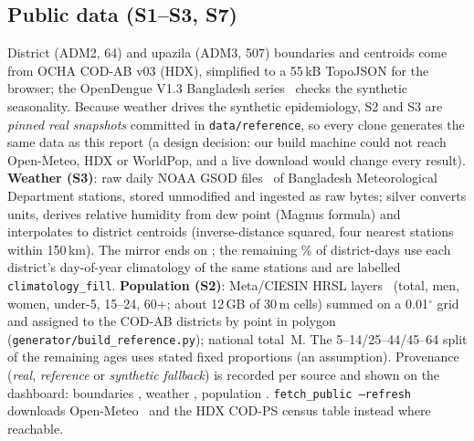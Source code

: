 \documentclass[conference]{IEEEtran}
\begin{document}
\subsection{Public data (S1--S3, S7)}
District (ADM2, 64) and upazila (ADM3, 507) boundaries and centroids come from OCHA COD-AB v03 (HDX),
simplified to a 55\,kB TopoJSON for the browser; the OpenDengue V1.3 Bangladesh series~\cite{opendengue} checks
the synthetic seasonality. Because weather drives the synthetic epidemiology, S2 and S3 are \emph{pinned real
snapshots} committed in \texttt{data/reference}, so every clone generates the same data as this report (a
design decision: our build machine could not reach Open-Meteo, HDX or WorldPop, and a live download would
change every result). \textbf{Weather (S3)}: raw daily NOAA GSOD files~\cite{gsod} of \WxStations{} Bangladesh
Meteorological Department stations, stored unmodified and ingested as raw bytes; silver converts units, derives
relative humidity from dew point (Magnus formula) and interpolates to district centroids (inverse-distance
squared, four nearest stations within 150\,km). The mirror ends on \WxObservedUntil{}; the remaining
\WxFillPct{}\% of district-days use each district's day-of-year climatology of the same stations and are labelled
\texttt{climatology\_fill}. \textbf{Population (S2)}: Meta/CIESIN HRSL layers~\cite{hrsl} (total, men, women,
under-5, 15--24, 60+; about 12\,GB of 30\,m cells) summed on a 0.01$^\circ$ grid and assigned to the COD-AB
districts by point in polygon (\texttt{generator/build\_reference.py}); national total \PopTotalM{}\,M. The
5--14/25--44/45--64 split of the remaining ages uses stated fixed proportions (an assumption). Provenance
(\emph{real}, \emph{reference} or \emph{synthetic fallback}) is recorded per source and shown on the dashboard:
boundaries \ProvBound{}, weather \ProvWeather{}, population \ProvPop{}. \texttt{fetch\_public --refresh}
downloads Open-Meteo~\cite{openmeteo} and the HDX COD-PS census table instead where reachable.
\end{document}
